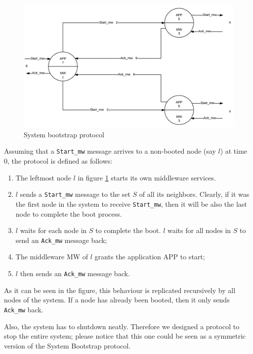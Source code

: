 \begin{figure}[H]
  \centering
  \includegraphics[width=\columnwidth]{sections/images/solution/bootstrap.pdf}
  \caption{System bootstrap protocol}
  \label{fig:sys-bootstrap-protocol}
\end{figure}

Assuming that a \texttt{Start\_mw} message arrives to a non-booted node (say
$l$) at time 0, the protocol is defined as follows:

\begin{enumerate}
  \item The leftmost node $l$ in figure \ref{fig:sys-bootstrap-protocol}
    starts its own middleware services.  
  \item $l$ sends a \texttt{Start\_mw} message to the set $S$ of all its
    neighbors. Clearly, if it was the first node in the system to receive
    \texttt{Start\_mw}, then it will be also the last node to complete the
    boot process.
  \item $l$ waits for each node in $S$ to complete the boot. $l$ waits for all
nodes in $S$ to send an \texttt{Ack\_mw} message back;
  \item The middleware MW of $l$ grants the application APP to start;
  \item $l$ then sends an \texttt{Ack\_mw} message back.
\end{enumerate}

As it can be seen in the figure, this behaviour is replicated recursively
by all nodes of the system. If a node has already been booted, then it only
sends \texttt{Ack\_mw} back.

Also, the system has to shutdown neatly. Therefore we designed a protocol to
stop the entire system; please notice that this one could be seen as a
symmetric version of the System Bootstrap protocol.

